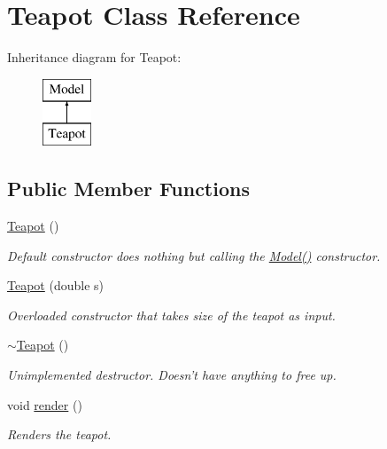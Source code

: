 \hypertarget{classTeapot}{\section{Teapot Class Reference}
\label{classTeapot}
}
Inheritance diagram for Teapot\-:\begin{figure}[H]
\begin{center}
\leavevmode
\includegraphics[height=2.000000cm]{classTeapot}
\end{center}
\end{figure}
\subsection*{Public Member Functions}
\begin{DoxyCompactItemize}
\item 
\hypertarget{classTeapot_aeb69723c977accc5a84cf958e492accd}{\hyperlink{classTeapot_aeb69723c977accc5a84cf958e492accd}{Teapot} ()}\label{classTeapot_aeb69723c977accc5a84cf958e492accd}

\begin{DoxyCompactList}\small\item\em Default constructor does nothing but calling the \hyperlink{classModel_ae3b375de5f6df4faf74a95d64748e048}{Model()} constructor. \end{DoxyCompactList}\item 
\hyperlink{classTeapot_ad64f28b4c9da6dba20f93b949af2522f}{Teapot} (double s)
\begin{DoxyCompactList}\small\item\em Overloaded constructor that takes size of the teapot as input. \end{DoxyCompactList}\item 
\hypertarget{classTeapot_a1c243d488157da74b0e1a2412a921f00}{\hyperlink{classTeapot_a1c243d488157da74b0e1a2412a921f00}{$\sim$\-Teapot} ()}\label{classTeapot_a1c243d488157da74b0e1a2412a921f00}

\begin{DoxyCompactList}\small\item\em Unimplemented destructor. Doesn't have anything to free up. \end{DoxyCompactList}\item 
\hypertarget{classTeapot_aababf7bd2833ebd3c34564b45b902163}{void \hyperlink{classTeapot_aababf7bd2833ebd3c34564b45b902163}{render} ()}\label{classTeapot_aababf7bd2833ebd3c34564b45b902163}

\begin{DoxyCompactList}\small\item\em Renders the teapot. \end{DoxyCompactList}\end{DoxyCompactItemize}


